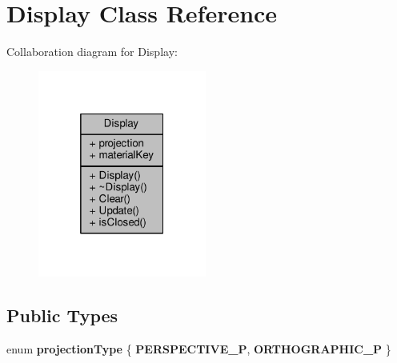 \hypertarget{class_display}{}\section{Display Class Reference}
\label{class_display}


Collaboration diagram for Display\+:\nopagebreak
\begin{figure}[H]
\begin{center}
\leavevmode
\includegraphics[width=157pt]{class_display__coll__graph}
\end{center}
\end{figure}
\subsection*{Public Types}
\begin{DoxyCompactItemize}
\item 
enum {\bfseries projection\+Type} \{ {\bfseries P\+E\+R\+S\+P\+E\+C\+T\+I\+V\+E\+\_\+P}, 
{\bfseries O\+R\+T\+H\+O\+G\+R\+A\+P\+H\+I\+C\+\_\+P}
 \}\hypertarget{class_display_a3ba4e50bfd82272df6f4d6b7ff930502}{}\label{class_display_a3ba4e50bfd82272df6f4d6b7ff930502}

\end{DoxyCompactItemize}
